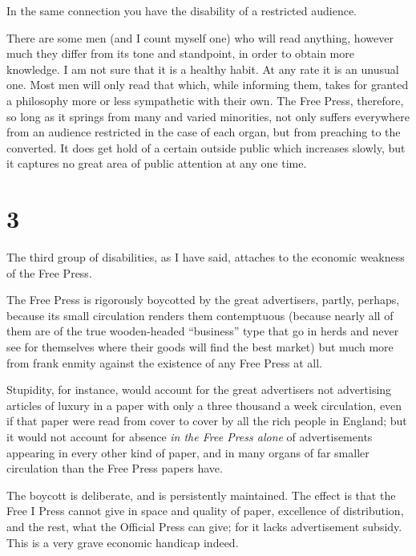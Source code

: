 \documentclass{book}
\begin{document}
In the same connection you have the disability of a restricted audience.

There are some men (and I count myself one) who will read anything, however much they differ from its tone and standpoint, in order to obtain more knowledge. I am not sure that it is a healthy habit. At any rate it is an unusual one. Most men will only read that which, while informing them, takes for granted a philosophy more or less sympathetic with their own. The Free Press, therefore, so long as it springs from many and varied minorities, not only suffers everywhere from an audience restricted in the case of each organ, but from preaching to the converted. It does get hold of a certain outside public which increases slowly, but it captures no great area of public attention at any one time.

\section*{3}
The third group of disabilities, as I have said, attaches to the economic weakness of the Free Press.

The Free Press is rigorously boycotted by the great advertisers, partly, perhaps, because its small circulation renders them contemptuous (because nearly all of them are of the true wooden-headed “business” type that go in herds and never see for themselves where their goods will find the best market) but much more from frank enmity against the existence of any Free Press at all.

Stupidity, for instance, would account for the great advertisers not advertising articles of luxury in a paper with only a three thousand a week circulation, even if that paper were read from cover to cover by all the rich people in England; but it would not account for absence \emph{in the Free Press alone} of advertisements appearing in every other kind of paper, and in many organs of far smaller circulation than the Free Press papers have.

The boycott is deliberate, and is persistently maintained. The effect is that the Free I Press cannot give in space and quality of paper, excellence of distribution, and the rest, what the Official Press can give; for it lacks advertisement subsidy. This is a very grave economic handicap indeed.
\end{document}
